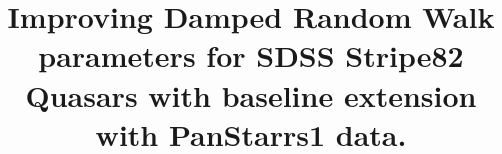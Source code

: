 \documentclass[twocolumn]{aastex62}
\begin{document}
\title{Improving Damped Random Walk parameters for SDSS Stripe82 Quasars with baseline extension with PanStarrs1 data. }



\end{document}
